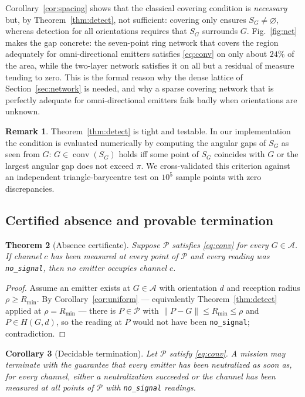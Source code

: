 \documentclass[preprint,12pt,3p]{elsarticle}
\newtheorem{theorem}{Theorem}
\newtheorem{corollary}[theorem]{Corollary}
\theoremstyle{definition}
\newtheorem{remark}[theorem]{Remark}
\newcommand{\conv}{\operatorname{conv}}
\newcommand{\Rmin}{R_{\min}}
\newcommand{\bA}{\mathcal{A}}
\newcommand{\bP}{\mathcal{P}}
\begin{document}
Corollary~\ref{cor:spacing} shows that the classical covering condition is \emph{necessary} but,
by Theorem~\ref{thm:detect}, not sufficient: covering only ensures $S_G\ne\varnothing$, whereas
detection for all orientations requires that $S_G$ surrounds $G$. Fig.~\ref{fig:net} makes the gap
concrete: the seven-point ring network that covers the region adequately for omni-directional
emitters satisfies \eqref{eq:conv} on only about $24\%$ of the area, while the two-layer network satisfies it on all but a residual of measure tending to zero. This is the formal reason why
the dense lattice of Section~\ref{sec:network} is needed, and why a sparse covering network that
is perfectly adequate for omni-directional emitters fails badly when orientations are unknown.

\begin{remark}
Theorem~\ref{thm:detect} is tight and testable. In our implementation the condition is evaluated
numerically by computing the angular gaps of $S_G$ as seen from $G$: $G\in\conv(S_G)$ holds iff
some point of $S_G$ coincides with $G$ or the largest angular gap does not exceed $\pi$. We
cross-validated this criterion against an independent triangle-barycentre test on $10^5$ sample
points with zero discrepancies.
\end{remark}

\subsection{Certified absence and provable termination}

\begin{theorem}[Absence certificate]
\label{thm:cert}
Suppose $\bP$ satisfies \eqref{eq:conv} for every $G\in\bA$. If channel $c$ has been measured at
every point of $\bP$ and every reading was \texttt{no\_signal}, then no emitter occupies channel
$c$.
\end{theorem}
\begin{proof}
Assume an emitter exists at $G\in\bA$ with orientation $d$ and reception radius $\rho\ge\Rmin$.
By Corollary~\ref{cor:uniform} --- equivalently Theorem~\ref{thm:detect} applied at $\rho=\Rmin$ ---
there is $P\in\bP$ with $\|P-G\|\le\Rmin\le\rho$ and $P\in H(G,d)$, so the reading at $P$ would not have
been \texttt{no\_signal}; contradiction.
\end{proof}

\begin{corollary}[Decidable termination]
\label{cor:terminate}
Let $\bP$ satisfy \eqref{eq:conv}. A mission may terminate with the guarantee that every emitter
has been neutralized as soon as, for every channel, either a neutralization succeeded or the
channel has been measured at all points of $\bP$ with \texttt{no\_signal} readings.
\end{corollary}
\end{document}
